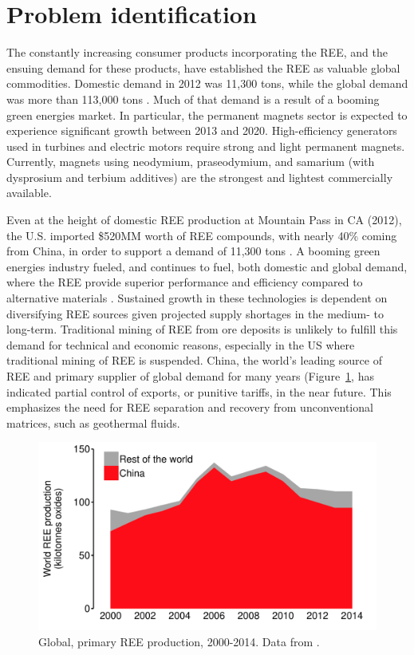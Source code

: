 \section{Problem identification}

The constantly increasing consumer products incorporating the REE, and the ensuing demand for these products, have established the REE as valuable global commodities.
Domestic demand in 2012 was 11,300 tons, while the global demand was more than 113,000 tons \citep{FrostSullivan_REEmarket}.
Much of that demand is a result of a booming green energies market.
In particular, the permanent magnets sector is expected to experience significant growth between 2013 and 2020.
High-efficiency generators used in turbines and electric motors require strong and light permanent magnets.
Currently, magnets using neodymium, praseodymium, and samarium (with dysprosium and terbium additives) are the strongest and lightest commercially available.

Even at the height of domestic REE production at Mountain Pass in CA (2012), the U.S. imported \$520MM worth of REE compounds, with nearly 40\% coming from China, in order to support a demand of 11,300 tons \citep{USGS_minyb_2012}.
A booming green energies industry fueled, and continues to fuel, both domestic and global demand, where the REE provide superior performance and efficiency compared to alternative materials \citep{Nassar_JIE_2015, Graedel_PNAS_2015}.
Sustained growth in these technologies is dependent on diversifying REE sources given projected supply shortages in the medium- to long-term.
Traditional mining of REE from ore deposits is unlikely to fulfill this demand for technical and economic reasons, especially in the US where traditional mining of REE is suspended.
China, the world's leading source of REE and primary supplier of global demand for many years (Figure~\ref{fig:world-REO-prod}, has indicated partial control of exports, or punitive tariffs, in the near future.
This emphasizes the need for REE separation and recovery from unconventional matrices, such as geothermal fluids.

\begin{figure}[htbp]
\begin{center}
\includegraphics[width = \textwidth]{Ch1_figures/World-REO-production.pdf}
\caption{Global, primary REE production, 2000-2014.
Data from \citet{USGS_commsumm}.}\label{fig:world-REO-prod}
\end{center}
\end{figure}

